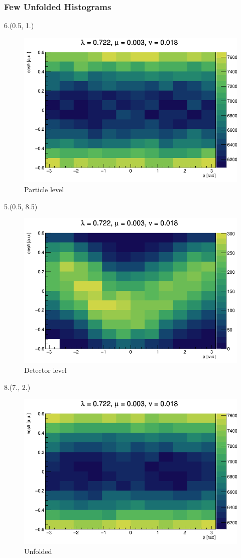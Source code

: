 \documentclass[12pt, xcolor={dvipsnames}, aspectratio = 169, sans, mathserif]{beamer}
\newenvironment{Pic}[2]
{\begin{textblock}{#1}#2
\begin{figure}}
{\end{figure}
\end{textblock}}
\begin{document}
\begin{frame}
\frametitle{Few Unfolded Histograms}

\begin{Pic}{6.}{(0.5, 1.)}
  \caption{Particle level}
  \includegraphics[width=6.cm]{imgs/true_fit_2.png}
\end{Pic}

\begin{Pic}{5.}{(0.5, 8.5)}
  \caption{Detector level}
  \includegraphics[width=5.cm]{imgs/reco_fit_2.png}
\end{Pic}

\begin{Pic}{8.}{(7., 2.)}
  \caption{Unfolded}
  \includegraphics[width=8.cm]{imgs/pred_fit_2.png}
\end{Pic}
\end{frame}
\end{document}
